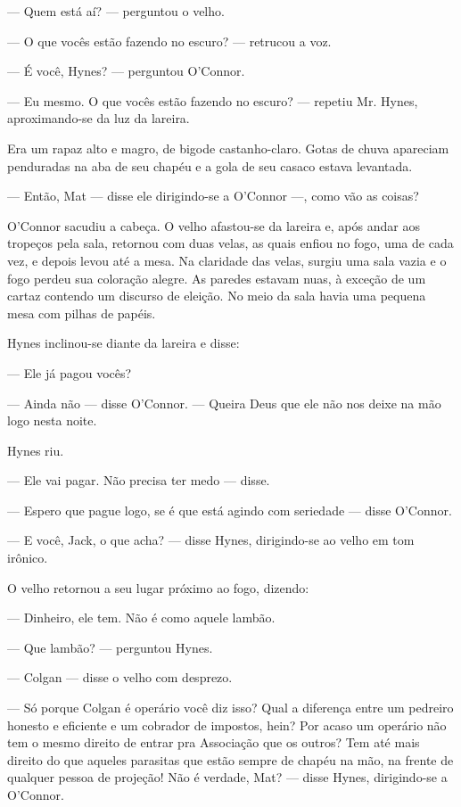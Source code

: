 --- Quem está aí? --- perguntou o velho.

--- O que vocês estão fazendo no escuro? --- retrucou a voz.

--- É você, Hynes? --- perguntou O'Connor.

--- Eu mesmo. O que vocês estão fazendo no escuro? --- repetiu Mr.
Hynes, aproximando-se da luz da lareira.

Era um rapaz alto e magro, de bigode castanho-claro. Gotas de chuva
apareciam penduradas na aba de seu chapéu e a gola de seu casaco
estava levantada.

--- Então, Mat --- disse ele dirigindo-se a O'Connor ---, como vão as
coisas?

O'Connor sacudiu a cabeça. O velho afastou-se da lareira e, após
andar aos tropeços pela sala, retornou com duas velas, as quais enfiou
no fogo, uma de cada vez, e depois levou até a mesa. Na claridade das
velas, surgiu uma sala vazia e o fogo perdeu sua coloração alegre. As
paredes estavam nuas, à exceção de um cartaz contendo um discurso de
eleição. No meio da sala havia uma pequena mesa com pilhas de papéis.

Hynes inclinou-se diante da lareira e disse:

--- Ele já pagou vocês?

--- Ainda não --- disse O'Connor. --- Queira Deus que ele não nos
deixe na mão logo nesta noite.

Hynes riu.

--- Ele vai pagar. Não precisa ter medo --- disse.

--- Espero que pague logo, se é que está agindo com seriedade
--- disse O'Connor.

--- E você, Jack, o que acha? --- disse Hynes, dirigindo-se ao velho
em tom irônico.

O velho retornou a seu lugar próximo ao fogo, dizendo:

--- Dinheiro, ele tem. Não é como aquele lambão.

--- Que lambão? --- perguntou Hynes.

--- Colgan --- disse o velho com desprezo.

--- Só porque Colgan é operário você diz isso? Qual a diferença entre
um pedreiro honesto e eficiente e um cobrador de impostos, hein? Por
acaso um operário não tem o mesmo direito de entrar pra Associação
que os outros? Tem até mais direito do que aqueles parasitas que estão
sempre de chapéu na mão, na frente de qualquer pessoa de projeção! Não
é verdade, Mat? --- disse Hynes, dirigindo-se a O'Connor.

